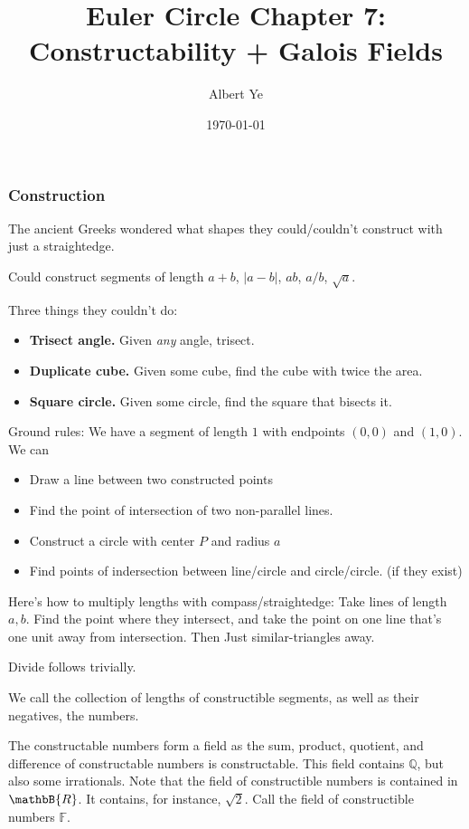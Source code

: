 \documentclass{scrartcl}
\title{Euler Circle Chapter 7: Constructability + Galois Fields}
\author{Albert Ye}
\date{\today}
\begin{document}
\maketitle
{}
\subsubsection{Construction}
The ancient Greeks wondered what shapes they could/couldn't construct with just a straightedge.

Could construct segments of length $a+b$, $|a-b|$, $ab$, $a/b$, $\sqrt{a}$.

Three things they couldn't do:
\begin{itemize}
	\item \textbf{Trisect angle.} Given \textit{any} angle, trisect.
	\item \textbf{Duplicate cube.} Given some cube, find the cube with twice the area.
	\item \textbf{Square circle.} Given some circle, find the square that bisects it.
\end{itemize}

Ground rules: We have a segment of length $1$ with endpoints $(0,0)$ and $(1,0)$. We can
\begin{itemize}
	\item Draw a line between two constructed points
	\item Find the point of intersection of two non-parallel lines.
	\item Construct a circle with center $P$ and radius $a$
	\item Find points of indersection between line/circle and circle/circle. (if they exist)
\end{itemize}
Here's how to multiply lengths with compass/straightedge: Take lines of length $a, b$. Find the point where they intersect, and take the point on one line that's one unit away from intersection. Then Just similar-triangles away.

Divide follows trivially.

\begin{definition}
	We call the collection of lengths of constructible segments, as well as their negatives, the  numbers.
\end{definition}

The constructable numbers form a field as the sum, product, quotient, and difference of constructable numbers is constructable. This field contains $\mathbb{Q}$, but also some irrationals. Note that the field of constructible numbers is contained in $\mathbB{R}$. It contains, for instance, $\sqrt{2}$. Call the field of constructible numbers $\mathbb{F}$. 
\end{document}
